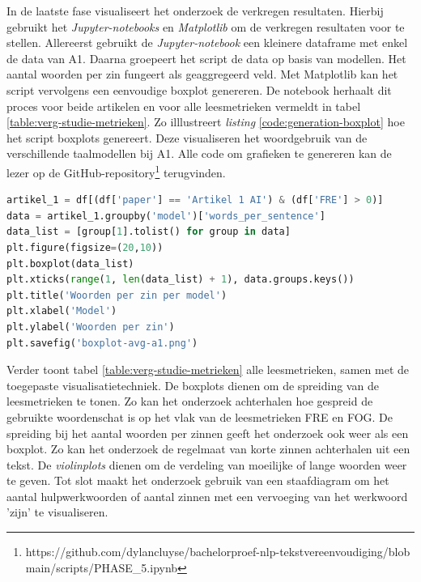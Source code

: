 In de laatste fase visualiseert het onderzoek de verkregen resultaten. Hierbij gebruikt het \textit{Jupyter-notebooks} en \textit{Matplotlib} om de verkregen resultaten voor te stellen. Allereerst gebruikt de \textit{Jupyter-notebook} een kleinere dataframe met enkel de data van A1. Daarna groepeert het script de data op basis van modellen. Het aantal woorden per zin fungeert als geaggregeerd veld. Met Matplotlib kan het script vervolgens een eenvoudige boxplot genereren. De notebook herhaalt dit proces voor beide artikelen en voor alle leesmetrieken vermeldt in tabel \ref{table:verg-studie-metrieken}. Zo illlustreert \textit{listing} \ref{code:generation-boxplot} hoe het script boxplots genereert. Deze visualiseren het woordgebruik van de verschillende taalmodellen bij A1. Alle code om grafieken te genereren kan de lezer op de GitHub-repository\footnote{https://github.com/dylancluyse/bachelorproef-nlp-tekstvereenvoudiging/blob main/scripts/PHASE\_5.ipynb} terugvinden. 

\begin{lstlisting}[language=Python, caption={Code om een boxplot voor het aantal woorden per zin te genereren.}, label={code:generation-boxplot}]	
artikel_1 = df[(df['paper'] == 'Artikel 1 AI') & (df['FRE'] > 0)]
data = artikel_1.groupby('model')['words_per_sentence']
data_list = [group[1].tolist() for group in data]
plt.figure(figsize=(20,10))
plt.boxplot(data_list)
plt.xticks(range(1, len(data_list) + 1), data.groups.keys())
plt.title('Woorden per zin per model')
plt.xlabel('Model')
plt.ylabel('Woorden per zin')
plt.savefig('boxplot-avg-a1.png')
\end{lstlisting}

Verder toont tabel \ref{table:verg-studie-metrieken} alle leesmetrieken, samen met de toegepaste visualisatietechniek. De boxplots dienen om de spreiding van de leesmetrieken te tonen. Zo kan het onderzoek achterhalen hoe gespreid de gebruikte woordenschat is op het vlak van de leesmetrieken FRE en FOG. De spreiding bij het aantal woorden per zinnen geeft het onderzoek ook weer als een boxplot. Zo kan het onderzoek de regelmaat van korte zinnen achterhalen uit een tekst. De \textit{violinplots} dienen om de verdeling van moeilijke of lange woorden weer te geven. Tot slot maakt het onderzoek gebruik van een staafdiagram om het aantal hulpwerkwoorden of aantal zinnen met een vervoeging van het werkwoord 'zijn' te visualiseren.

